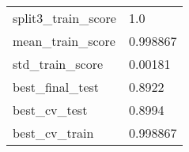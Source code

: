 \begin{tabular}{ll}
split3\_train\_score            &                                                1.0 \\
mean\_train\_score              &                                           0.998867 \\
std\_train\_score               &                                            0.00181 \\
best\_final\_test               &                                             0.8922 \\
best\_cv\_test                  &                                             0.8994 \\
best\_cv\_train                 &                                           0.998867 \\
\bottomrule
\end{tabular}
